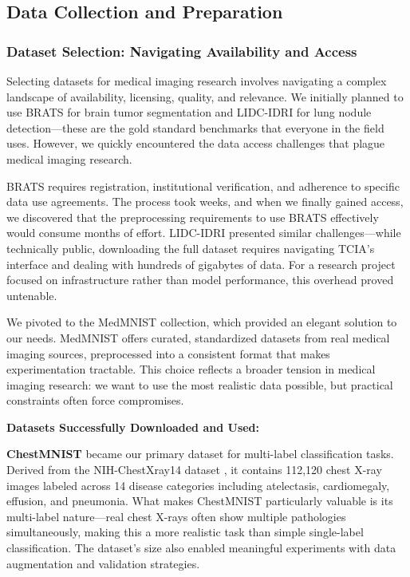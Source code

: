 \documentclass[12pt,a4paper]{article}
\begin{document}
\subsection{Data Collection and Preparation}

\subsubsection{Dataset Selection: Navigating Availability and Access}

Selecting datasets for medical imaging research involves navigating a complex landscape of availability, licensing, quality, and relevance. We initially planned to use BRATS for brain tumor segmentation and LIDC-IDRI for lung nodule detection—these are the gold standard benchmarks that everyone in the field uses. However, we quickly encountered the data access challenges that plague medical imaging research.

BRATS requires registration, institutional verification, and adherence to specific data use agreements. The process took weeks, and when we finally gained access, we discovered that the preprocessing requirements to use BRATS effectively would consume months of effort. LIDC-IDRI presented similar challenges—while technically public, downloading the full dataset requires navigating TCIA's interface and dealing with hundreds of gigabytes of data. For a research project focused on infrastructure rather than model performance, this overhead proved untenable.

We pivoted to the MedMNIST collection, which provided an elegant solution to our needs. MedMNIST offers curated, standardized datasets from real medical imaging sources, preprocessed into a consistent format that makes experimentation tractable. This choice reflects a broader tension in medical imaging research: we want to use the most realistic data possible, but practical constraints often force compromises.

\textbf{Datasets Successfully Downloaded and Used:}

\textbf{ChestMNIST} became our primary dataset for multi-label classification tasks. Derived from the NIH-ChestXray14 dataset \cite{wang2017chestxray8}, it contains 112,120 chest X-ray images labeled across 14 disease categories including atelectasis, cardiomegaly, effusion, and pneumonia. What makes ChestMNIST particularly valuable is its multi-label nature—real chest X-rays often show multiple pathologies simultaneously, making this a more realistic task than simple single-label classification. The dataset's size also enabled meaningful experiments with data augmentation and validation strategies.
\end{document}
